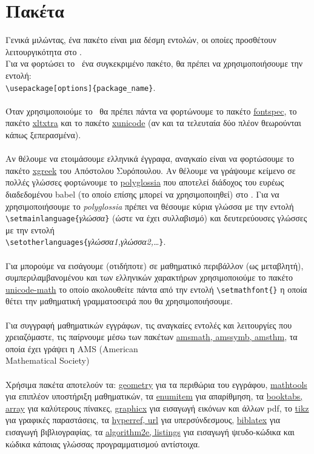 \documentclass[a4paper, 12pt, oneside, xelatex, final]{article}
\begin{document}
\section{Πακέτα}
	\noindent Γενικά μιλώντας, ένα πακέτο είναι μια δέσμη εντολών, οι οποίες προσθέτουν λειτουργικότητα στο \XeLaTeX.\\
	Για να φορτώσει το \XeLaTeX\ ένα συγκεκριμένο πακέτο, θα πρέπει να χρησιμοποιήσουμε την εντολή:\\
	\verb+\usepackage[options]{package_name}+.\\
	\\
	Όταν χρησιμοποιούμε το \XeLaTeX\ θα πρέπει πάντα να φορτώνουμε το πακέτο \underline{fontspec}, το πακέτο \underline{xltxtra} και το πακέτο \underline{xunicode} (αν και τα τελευταία δύο πλέον θεωρούνται κάπως ξεπερασμένα).\\ \\
	Αν θέλουμε να ετοιμάσουμε ελληνικά έγγραφα, αναγκαίο είναι να φορτώσουμε το πακέτο \underline{xgreek} του Απόστολου Συρόπουλου. Αν θέλουμε να γράψουμε κείμενο σε πολλές γλώσσες φορτώνουμε το \underline{polyglossia} που αποτελεί διάδοχος του ευρέως διαδεδομένου babel (το οποίο επίσης μπορεί να χρησιμοποιηθεί) στο \XeLaTeX. Για να χρησιμοποιήσουμε το \emph{polyglossia} πρέπει να θέσουμε κύρια γλώσσα με την εντολή \verb+\setmainlanguage{+\emph{γλώσσα}\verb+}+  (ώστε να έχει συλλαβισμό) και δευτερεύουσες γλώσσες με την εντολή\\
	 \verb+\setotherlanguages{+\emph{γλώσσα1,γλώσσα2,}\ldots \verb+}+.\\ \\
	Για μπορούμε να εισάγουμε (οτιδήποτε) σε μαθηματικό περιβάλλον (ως μεταβλητή), συμπεριλαμβανομένου και των ελληνικών χαρακτήρων χρησιμοποιούμε το πακέτο \underline{unicode-math} το οποίο ακολουθείτε πάντα από την εντολή \verb|\setmathfont{}| η οποία θέτει την μαθηματική γραμματοσειρά που θα χρησιμοποιήσουμε.\\
	\\
	Για συγγραφή μαθηματικών εγγράφων, τις αναγκαίες εντολές και λειτουργίες που χρειαζόμαστε, τις παίρνουμε μέσω των πακέτων \underline{amsmath, amssymb, amsthm}, τα οποία έχει γράψει η AMS (American \\ Mathematical Society)\\
	\hfil\\
	Χρήσιμα πακέτα αποτελούν τα: \underline{geometry} για τα περιθώρια του εγγράφου, \underline{mathtools} για επιπλέον υποστήριξη μαθηματικών, τα \underline{enumitem} για απαρίθμηση, τα \underline{booktabs, array} για καλύτερους πίνακες, \underline{graphicx} για εισαγωγή εικόνων και άλλων pdf, το \underline{tikz} για γραφικές παραστάσεις, τα \underline{hyperref, url} για υπερσύνδεσμους, \underline{biblatex} για εισαγωγή βιβλιογραφίας, τα \underline{algorithm2e, listings} για εισαγωγή ψευδο-κώδικα και κώδικα κάποιας γλώσσας προγραμματισμού αντίστοιχα.\\ 
\end{document}
